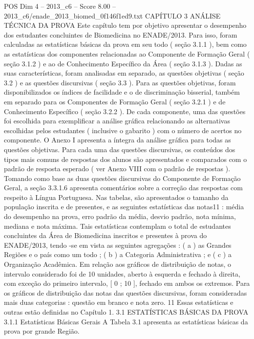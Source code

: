 \begin{textsample}{POS Dim 4 – 2013\_c6 – Score 8.00 – 2013\_c6/enade\_2013\_biomed\_0f146f1ed9.txt}  \label{ex:f4_pos_049}
CAPÍTULO 3 ANÁLISE TÉCNICA DA PROVA Este capítulo tem por objetivo apresentar o desempenho dos estudantes concluintes de Biomedicina no ENADE/2013.
Para isso, foram calculadas as estatísticas básicas da prova em seu todo ( seção 3.1.1 ), bem como as estatísticas dos componentes relacionadas ao Componente de Formação Geral ( seção 3.1.2 ) e ao de Conhecimento Específico da Área ( seção 3.1.3 ).
Dadas as suas características, foram analisadas em separado, as questões objetivas ( seção 3.2 ) e as questões discursivas ( seção 3.3 ).
Para as questões objetivas, foram disponibilizados os índices de facilidade e o de discriminação bisserial, também em separado para os Componentes de Formação Geral ( seção 3.2.1 ) e de Conhecimento Específico ( seção 3.2.2 ).
De cada componente, uma das questões foi escolhida para exemplificar a análise gráfica relacionando as alternativas escolhidas pelos estudantes ( inclusive o gabarito ) com o número de acertos no componente.
O Anexo I apresenta a íntegra da análise gráfica para todas as questões objetivas.
Para cada uma das questões discursivas, os conteúdos dos tipos mais comuns de respostas dos alunos são apresentados e comparados com o padrão de resposta esperado ( ver Anexo VIII com o padrão de respostas ).
Tomando como base as duas questões discursivas do Componente de Formação Geral, a seção 3.3.1.6 apresenta comentários sobre a correção das respostas com respeito à Língua Portuguesa.
Nas tabelas, são apresentados o tamanho da população inscrita e de presentes, e as seguintes estatísticas das notas11 : média do desempenho na prova, erro padrão da média, desvio padrão, nota mínima, mediana e nota máxima.
Tais estatísticas contemplam o total de estudantes concluintes da Área de Biomedicina inscritos e presentes à prova do ENADE/2013, tendo -se em vista as seguintes agregações : ( a ) as Grandes Regiões e o país como um todo ; ( b ) a Categoria Administrativa ; e ( c ) a Organização Acadêmica.
Em relação aos gráficos de distribuição de notas, o intervalo considerado foi de 10 unidades, aberto à esquerda e fechado à direita, com exceção do primeiro intervalo, [ 0 ; 10 ], fechado em ambos os extremos.
Para os gráficos de distribuição das notas das questões discursivas, foram consideradas mais duas categorias : questão em branco e nota zero. 11 Essas estatísticas e outras estão definidas no Capítulo 1. 3.1 ESTATÍSTICAS BÁSICAS DA PROVA 3.1.1 Estatísticas Básicas Gerais A Tabela 3.1 apresenta as estatísticas básicas da prova por grande Região.

\end{textsample}
